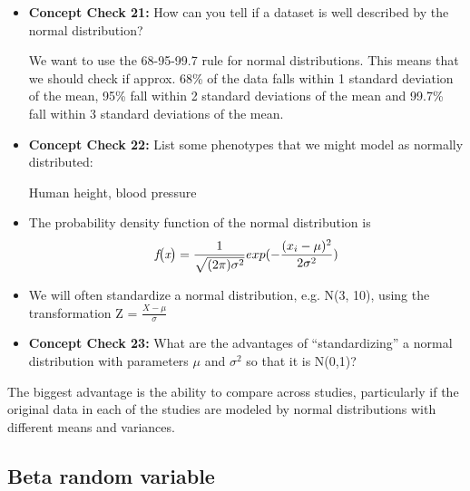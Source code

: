 \documentclass[12pt]{report}
\begin{document}
\begin{itemize}

\item  \textbf{Concept Check 21:} How can you tell if a dataset is well described by the normal distribution? 

\color{red} We want to use the 68-95-99.7 rule for normal distributions. This means that we should check if approx. 68\% of the data falls within 1 standard deviation of the mean, 95\% fall within 2 standard deviations of the mean and 99.7\% fall within 3 standard deviations of the mean. 
\color{black}
\bigskip

\item \textbf{Concept Check 22:} List some phenotypes that we might model as normally distributed:

\color{red} Human height, blood pressure

\color{black}

\item The probability density function of the normal distribution is 
\begin{eqnarray}
\textit{f\big(x\big)} = \frac{1}{\sqrt{(2\pi)\sigma^{2}}} exp(-\frac{(x_{i}-\mu)^{2}}{2\sigma^{2}} )
\end{eqnarray}

\bigskip
\item We will often standardize a normal distribution, e.g. N(3, 10), using the transformation Z = 
$\frac{\textit{X} - \mu}{\sigma}$


\item  \textbf{Concept Check 23:} What are the advantages of ``standardizing'' a normal distribution with parameters $\mu$ and $\sigma^{2}$ so that it is N(0,1)?

\end{itemize}

\color{red} The biggest advantage is the ability to compare across studies, particularly if the original data in each of the studies are modeled by normal distributions with different means and variances. 

\color{black}

\subsection{Beta random variable} 
\end{document}
